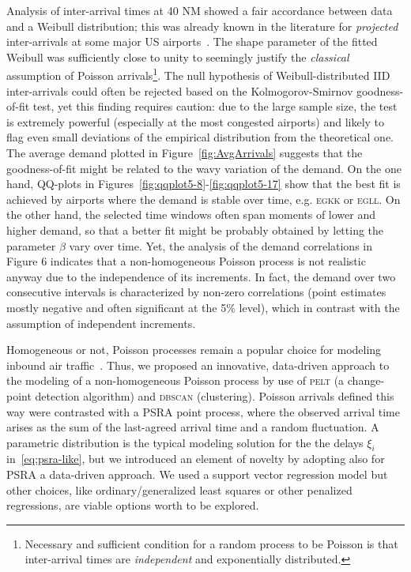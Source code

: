 \documentclass[draft,review]{elsarticle}
\makeatletter
\newcommand*{\eg}{e.g.\@\xspace}
\newcommand{\PELT}{\textsc{pelt}}
\newcommand{\DBSCAN}{\textsc{dbscan}}
\newcommand{\airp}[1]{\textcolor{#1}{\textsc{#1}}}
\makeatother
\begin{document}
  Analysis of inter-arrival times at 40 NM showed a fair accordance between data and a Weibull distribution; this was already known in the literature for \emph{projected} inter-arrivals at some major US airports~\citep{willemain2004statistical}.
  The shape parameter of the fitted Weibull was sufficiently close to unity to seemingly justify the \emph{classical} assumption of Poisson arrivals\footnote{Necessary and sufficient condition for a random process to be Poisson is that inter-arrival times are \emph{independent} and exponentially distributed.}.
  The null hypothesis of Weibull-distributed \ac{IID} inter-arrivals could often be rejected based on the Kolmogorov-Smirnov goodness-of-fit test, yet this finding requires caution: due to the large sample size, the test is extremely powerful (especially at the most congested airports) and likely to flag even small deviations of the empirical distribution from the theoretical one.
  The average demand plotted in Figure~\ref{fig:AvgArrivals} suggests that the goodness-of-fit might be related to the wavy variation of the demand.
  On the one hand, QQ-plots in Figures~\ref{fig:qqplot5-8}-\ref{fig:qqplot5-17} show that the best fit is achieved by airports where the demand is stable over time, \eg{} \airp{egkk} or \airp{egll}.
  On the other hand, the selected time windows often span moments of lower and higher demand, so that a better fit might be probably obtained by letting the parameter $\beta$ vary over time.
  Yet, the analysis of the demand correlations in Figure 6 indicates that a non-homogeneous Poisson process is not realistic anyway due to the independence of its increments. In fact, the demand over two consecutive intervals is characterized by non-zero correlations (point estimates mostly negative and often significant at the 5\% level), which in contrast with the assumption of independent increments.

  Homogeneous or not, Poisson processes remain a popular choice for modeling inbound air traffic~\citep{gwiggner2014data}.
  Thus, we proposed an innovative, data-driven approach to the modeling of a non-homogeneous Poisson process by use of \PELT{} (a change-point detection algorithm) and \DBSCAN{} (clustering).
  Poisson arrivals defined this way were contrasted with a \ac{PSRA} point process, where the observed arrival time arises as the sum of the last-agreed arrival time and a random fluctuation.
  A parametric distribution is the typical modeling solution for the the delays \(\xi_i\) in~\eqref{eq:psra-like}, but we introduced an element of novelty by adopting also for \ac{PSRA} a data-driven approach.
  We used a support vector regression model but other choices, like ordinary/generalized least squares or other penalized regressions, are viable options worth to be explored.
\end{document}
